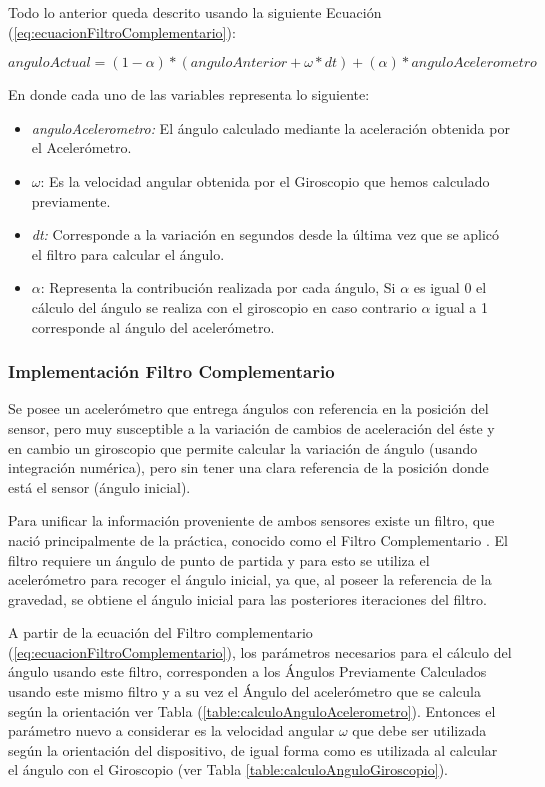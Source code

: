 \documentclass[12pt,a4paper]{article}
\begin{document}
Todo lo anterior queda descrito usando la siguiente Ecuación (\ref{eq:ecuacionFiltroComplementario}):

\begin{equation}
\label{eq:ecuacionFiltroComplementario}
anguloActual = (1-\alpha)*(anguloAnterior+\omega*dt)+(\alpha)*anguloAcelerometro
\end{equation}

En donde cada uno de las variables representa lo siguiente:
\begin{itemize}
	\item \textit{anguloAcelerometro:} El ángulo calculado mediante la aceleración obtenida por el Acelerómetro.
	\item $\omega$: Es la velocidad angular obtenida por el Giroscopio que hemos calculado previamente.
	\item \textit{dt:} Corresponde a la variación en segundos desde la última vez que se aplicó el filtro para calcular el ángulo.
	\item $\alpha$: Representa la contribución realizada por cada ángulo, Si $\alpha$ es igual 0 el cálculo del ángulo se realiza con el giroscopio en caso contrario $\alpha$ igual a 1 corresponde al ángulo del acelerómetro.
\end{itemize}

\subsubsection{Implementación Filtro Complementario}
Se posee un acelerómetro que entrega ángulos con referencia en la posición del sensor, pero muy susceptible a la variación de cambios de aceleración del éste y en cambio un giroscopio que permite calcular la variación de ángulo (usando integración numérica), pero sin tener una clara referencia de la posición donde está el sensor (ángulo inicial).

Para unificar la información proveniente de ambos sensores existe un filtro, que nació principalmente de la práctica, conocido como el Filtro Complementario \cite{TesisUSM}.
El filtro requiere un ángulo de punto de partida y para esto se utiliza el acelerómetro para recoger el ángulo inicial, ya que, al poseer la referencia de la gravedad, se obtiene el ángulo inicial para las posteriores iteraciones del filtro.


A partir de la ecuación del Filtro complementario (\ref{eq:ecuacionFiltroComplementario}), los parámetros necesarios para el cálculo del ángulo usando este filtro, corresponden a los Ángulos Previamente Calculados usando este mismo filtro y a su vez el Ángulo del acelerómetro que se calcula según la orientación ver Tabla (\ref{table:calculoAnguloAcelerometro}).
Entonces el parámetro nuevo a considerar es la velocidad angular $\omega$ que debe ser utilizada según la orientación del dispositivo, de igual forma como es utilizada al calcular el ángulo con el Giroscopio (ver Tabla \ref{table:calculoAnguloGiroscopio}).
\end{document}

